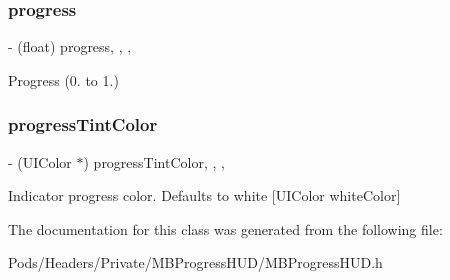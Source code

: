\subsubsection{\texorpdfstring{progress}{progress}}
{\footnotesize\ttfamily -\/ (float) progress\hspace{0.3cm}{\ttfamily [read]}, {\ttfamily [write]}, {\ttfamily [nonatomic]}, {\ttfamily [assign]}}

Progress (0. to 1.) \mbox{\label{interface_m_b_round_progress_view_a5a14c2e5b5785c25fe9d65befaa60c5c}} 
\subsubsection{\texorpdfstring{progress\+Tint\+Color}{progressTintColor}}
{\footnotesize\ttfamily -\/ (U\+I\+Color $\ast$) progress\+Tint\+Color\hspace{0.3cm}{\ttfamily [read]}, {\ttfamily [write]}, {\ttfamily [nonatomic]}, {\ttfamily [assign]}}

Indicator progress color. Defaults to white \mbox{[}U\+I\+Color white\+Color\mbox{]} 

The documentation for this class was generated from the following file\+:\begin{DoxyCompactItemize}
\item 
Pods/\+Headers/\+Private/\+M\+B\+Progress\+H\+U\+D/M\+B\+Progress\+H\+U\+D.\+h\end{DoxyCompactItemize}
